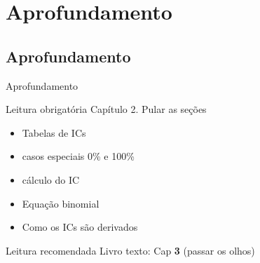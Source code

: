 \documentclass{beamer}
\begin{document}
\section{Aprofundamento}

\subsection{Aprofundamento}

\begin{frame}{\scriptsize Aprofundamento}
  \begin{block}{Leitura obrigatória}
    \footnotesize
    Capítulo 2. Pular as seções
    \begin{itemize}
      \scriptsize
    \item Tabelas de ICs
    \item casos especiais 0\% e 100\%
    \item cálculo do IC
    \item Equação binomial
    \item Como os ICs são derivados
    \end{itemize}
  \end{block}
  \begin{block}{Leitura recomendada}
    \scriptsize
    Livro texto: Cap {\bf 3} (passar os olhos)
  \end{block}
\end{frame}
\end{document}
